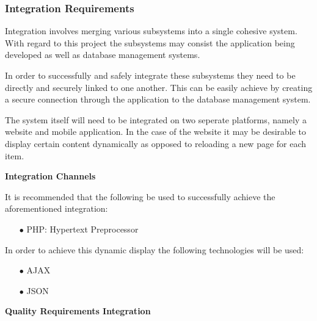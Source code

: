 \documentclass[a4paper,12pt]{article}
\begin{document}
\subsubsection{Integration Requirements}
\begin{flushleft}
Integration involves merging various subsystems into a single cohesive system. With regard to this project the subsystems may consist the application being developed as well as database management systems.

In order to successfully and safely integrate these subsystems they need to be directly and securely linked to one another. This can be easily achieve by creating a secure connection through the application to the database management system. 

The system itself will need to be integrated on two seperate platforms, namely a website and mobile application. In the case of the website it may be desirable to display certain content dynamically as opposed to reloading a new page for each item.

\textbf{Integration Channels}

It is recommended that the following be used to successfully achieve the aforementioned integration:
\begin{itemize}
	\item[$\bullet$]PHP: Hypertext Preprocessor
\end{itemize}
In order to achieve this dynamic display the following technologies will be used:
 \begin{itemize}
	\item[$\bullet$]AJAX
	\item[$\bullet$]JSON
\end{itemize}

\textbf{Quality Requirements Integration}


\end{flushleft}
\end{document}
